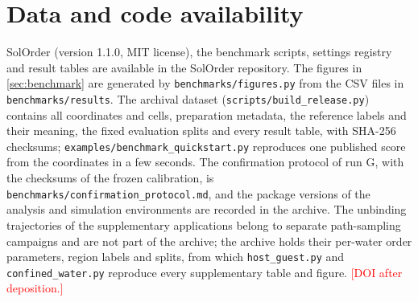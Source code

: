 \documentclass[11pt,a4paper]{article}
\newcommand{\todo}[1]{\textcolor{red}{[#1]}}
\begin{document}
\section*{Data and code availability}
SolOrder (version 1.1.0, MIT license), the benchmark scripts, settings
registry and result tables are available in the SolOrder repository. The
figures in \cref{sec:benchmark} are generated by
\texttt{benchmarks/figures.py} from the CSV files in
\texttt{benchmarks/results}. The archival dataset (\texttt{scripts/build\_release.py})
contains all coordinates and cells, preparation metadata, the reference
labels and their meaning, the fixed evaluation splits and every result
table, with SHA-256 checksums; \texttt{examples/benchmark\_quickstart.py}
reproduces one published score from the coordinates in a few seconds. The
confirmation protocol of run G, with the checksums of the frozen calibration,
is \texttt{benchmarks/confirmation\_protocol.md}, and the package versions of
the analysis and simulation environments are recorded in the archive. The
unbinding trajectories of the supplementary applications belong to separate
path-sampling campaigns and are not part of the archive; the archive holds
their per-water order parameters, region labels and splits, from which
\texttt{host\_guest.py} and \texttt{confined\_water.py} reproduce every
supplementary table and figure.
\todo{DOI after deposition.}



\end{document}

